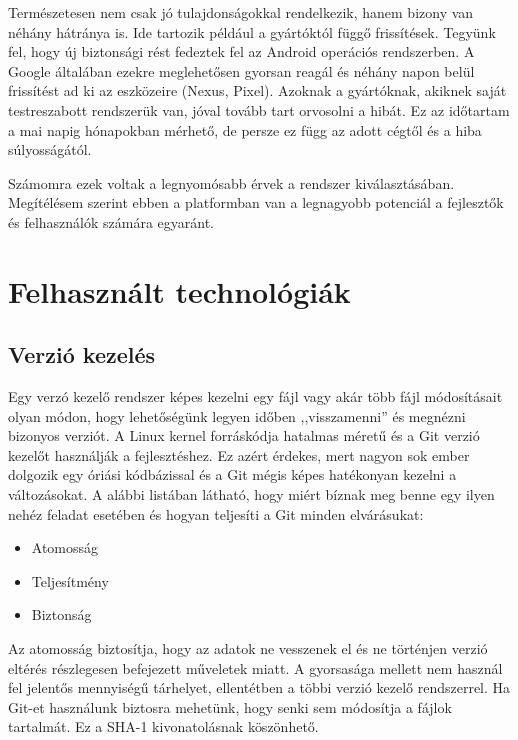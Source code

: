 \documentclass{thesis-ekf}
\theoremstyle{definition}
\theoremstyle{remark}
\begin{document}
Természetesen nem csak jó tulajdonságokkal rendelkezik, hanem bizony van néhány hátránya is.
Ide tartozik például a gyártóktól függő frissítések.
Tegyünk fel, hogy új biztonsági rést fedeztek fel az Android operációs rendszerben.
A Google általában ezekre meglehetősen gyorsan reagál és néhány napon belül frissítést ad ki az eszközeire (Nexus, Pixel).
Azoknak a gyártóknak, akiknek saját testreszabott rendszerük van, jóval tovább tart orvosolni a hibát.
Ez az időtartam a mai napig hónapokban mérhető, de persze ez függ az adott cégtől és a hiba súlyosságától. 

Számomra ezek voltak a legnyomósabb érvek a rendszer kiválasztásában.
Megítélésem szerint ebben a platformban van a legnagyobb potenciál a fejlesztők és felhasználók számára egyaránt.

\chapter{Felhasznált technológiák}\label{technologiak}

\section{Verzió kezelés}

Egy verzó kezelő rendszer képes kezelni egy fájl vagy akár több fájl módosításait olyan módon, hogy lehetőségünk legyen időben ,,visszamenni'' és megnézni bizonyos verziót.
A Linux kernel forráskódja hatalmas méretű és a Git verzió kezelőt használják a fejlesztéshez.
Ez azért érdekes, mert nagyon sok ember dolgozik egy óriási kódbázissal és a Git mégis képes hatékonyan kezelni a változásokat.
A alábbi listában látható, hogy miért bíznak meg benne egy ilyen nehéz feladat esetében és hogyan teljesíti a Git minden elvárásukat:

\begin{itemize}
	\item Atomosság
	\item Teljesítmény
	\item Biztonság
\end{itemize}

Az atomosság biztosítja, hogy az adatok ne vesszenek el és ne történjen verzió eltérés részlegesen befejezett műveletek miatt.
A gyorsasága mellett nem használ fel jelentős mennyiségű tárhelyet, ellentétben a többi verzió kezelő rendszerrel.
Ha Git-et használunk biztosra mehetünk, hogy senki sem módosítja a fájlok tartalmát. Ez a SHA-1 kivonatolásnak köszönhető.\cite{git}
\end{document}

